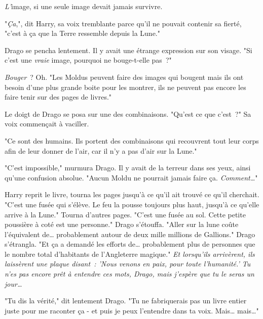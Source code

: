 \emph{L'}image, si une seule image devait jamais survivre.

"\emph{Ça},", dit Harry, sa voix tremblante parce qu'il ne pouvait contenir sa fierté, "c'est à ça que la Terre ressemble depuis la Lune."

Drago se pencha lentement. Il y avait une étrange expression sur son visage. "Si c'est une \emph{vraie} image, pourquoi ne bouge-t-elle pas~?"

\emph{Bouger}~? Oh. "Les Moldus peuvent faire des images qui bougent mais ils ont besoin d'une plus grande boite pour les montrer, ils ne peuvent pas encore les faire tenir sur des pages de livres."

Le doigt de Drago se posa sur une des combinaisons. "Qu'est ce que c'est~?" Sa voix commençait à vaciller.

"Ce sont des humains. Ils portent des combinaisons qui recouvrent tout leur corps afin de leur donner de l'air, car il n'y a pas d'air sur la Lune."

"C'est impossible," murmura Drago. Il y avait de la terreur dans ses yeux, ainsi qu'une confusion absolue. "Aucun Moldu ne pourrait jamais faire ça. \emph{Comment…}"

Harry reprit le livre, tourna les pages jusqu'à ce qu'il ait trouvé ce qu'il cherchait. "C'est une fusée qui s'élève. Le feu la pousse toujours plus haut, jusqu'à ce qu'elle arrive à la Lune." Tourna d'autres pages. "C'est une fusée au sol. Cette petite poussière à coté est une personne." Drago s'étouffa. "Aller sur la lune coûte l'équivalent de… probablement autour de deux mille millions de Gallions." Drago s'étrangla. "Et ça a demandé les efforts de… probablement plus de personnes que le nombre total d'habitants de l'Angleterre magique." \emph{Et lorsqu'ils arrivèrent, ils laissèrent une plaque disant~: 'Nous venons en paix, pour toute l'humanité.' Tu n'es pas encore prêt à entendre ces mots, Drago, mais j'espère que tu le seras un jour…}

"Tu dis la vérité," dit lentement Drago. "Tu ne fabriquerais pas un livre entier juste pour me raconter ça - et puis je peux l'entendre dans ta voix. Mais… mais…"

